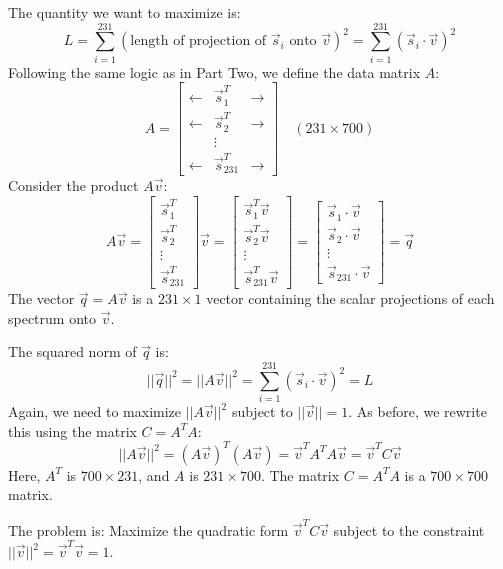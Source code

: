 \documentclass{report}
\begin{document}
\sol
The quantity we want to maximize is:
\[
	L = \sum_{i=1}^{231} (\text{length of projection of } \vec{s}_i \text{ onto } \vec{v})^2 = \sum_{i=1}^{231} (\vec{s}_i \cdot \vec{v})^2
\]
Following the same logic as in Part Two, we define the data matrix $A$:
\[
	A = \begin{bmatrix} \longleftarrow & \vec{s}_1^T & \longrightarrow \\ \longleftarrow & \vec{s}_2^T & \longrightarrow \\ & \vdots & \\ \longleftarrow & \vec{s}_{231}^T & \longrightarrow \end{bmatrix} \quad (231 \times 700)
\]
Consider the product $A\vec{v}$:
\[
	A\vec{v} = \begin{bmatrix} \vec{s}_1^T \\ \vec{s}_2^T \\ \vdots \\ \vec{s}_{231}^T \end{bmatrix} \vec{v} = \begin{bmatrix} \vec{s}_1^T \vec{v} \\ \vec{s}_2^T \vec{v} \\ \vdots \\ \vec{s}_{231}^T \vec{v} \end{bmatrix} = \begin{bmatrix} \vec{s}_1 \cdot \vec{v} \\ \vec{s}_2 \cdot \vec{v} \\ \vdots \\ \vec{s}_{231} \cdot \vec{v} \end{bmatrix} = \vec{q}
\]
The vector $\vec{q} = A\vec{v}$ is a $231 \times 1$ vector containing the scalar projections of each spectrum onto $\vec{v}$.

The squared norm of $\vec{q}$ is:
\[
	||\vec{q}||^2 = ||A\vec{v}||^2 = \sum_{i=1}^{231} (\vec{s}_i \cdot \vec{v})^2 = L
\]
Again, we need to maximize $||A\vec{v}||^2$ subject to $||\vec{v}||=1$.
As before, we rewrite this using the matrix $C = A^T A$:
\[
	||A\vec{v}||^2 = (A\vec{v})^T (A\vec{v}) = \vec{v}^T A^T A \vec{v} = \vec{v}^T C \vec{v}
\]
Here, $A^T$ is $700 \times 231$, and $A$ is $231 \times 700$.
The matrix $C = A^T A$ is a $700 \times 700$ matrix.

The problem is:
Maximize the quadratic form $\vec{v}^T C \vec{v}$ subject to the constraint $||\vec{v}||^2 = \vec{v}^T\vec{v} = 1$.

\end{document}
